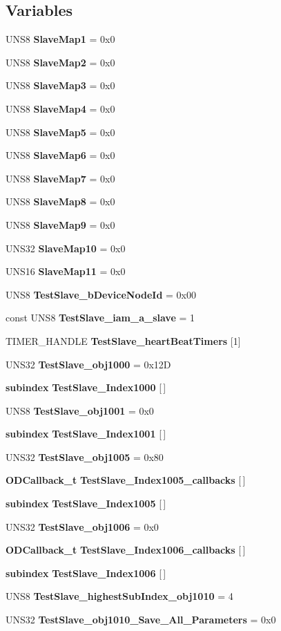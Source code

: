 \subsection*{Variables}
\begin{CompactItemize}
\item 
UNS8 {\bf Slave\-Map1} = 0x0
\item 
UNS8 {\bf Slave\-Map2} = 0x0
\item 
UNS8 {\bf Slave\-Map3} = 0x0
\item 
UNS8 {\bf Slave\-Map4} = 0x0
\item 
UNS8 {\bf Slave\-Map5} = 0x0
\item 
UNS8 {\bf Slave\-Map6} = 0x0
\item 
UNS8 {\bf Slave\-Map7} = 0x0
\item 
UNS8 {\bf Slave\-Map8} = 0x0
\item 
UNS8 {\bf Slave\-Map9} = 0x0
\item 
UNS32 {\bf Slave\-Map10} = 0x0
\item 
UNS16 {\bf Slave\-Map11} = 0x0
\item 
UNS8 {\bf Test\-Slave\_\-b\-Device\-Node\-Id} = 0x00
\item 
const UNS8 {\bf Test\-Slave\_\-iam\_\-a\_\-slave} = 1
\item 
TIMER\_\-HANDLE {\bf Test\-Slave\_\-heart\-Beat\-Timers} [1]
\item 
UNS32 {\bf Test\-Slave\_\-obj1000} = 0x12D
\item 
{\bf subindex} {\bf Test\-Slave\_\-Index1000} [$\,$]
\item 
UNS8 {\bf Test\-Slave\_\-obj1001} = 0x0
\item 
{\bf subindex} {\bf Test\-Slave\_\-Index1001} [$\,$]
\item 
UNS32 {\bf Test\-Slave\_\-obj1005} = 0x80
\item 
{\bf ODCallback\_\-t} {\bf Test\-Slave\_\-Index1005\_\-callbacks} [$\,$]
\item 
{\bf subindex} {\bf Test\-Slave\_\-Index1005} [$\,$]
\item 
UNS32 {\bf Test\-Slave\_\-obj1006} = 0x0
\item 
{\bf ODCallback\_\-t} {\bf Test\-Slave\_\-Index1006\_\-callbacks} [$\,$]
\item 
{\bf subindex} {\bf Test\-Slave\_\-Index1006} [$\,$]
\item 
UNS8 {\bf Test\-Slave\_\-highest\-Sub\-Index\_\-obj1010} = 4
\item 
UNS32 {\bf Test\-Slave\_\-obj1010\_\-Save\_\-All\_\-Parameters} = 0x0

\end{CompactItemize}
